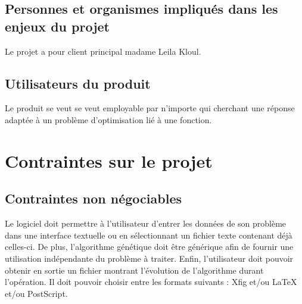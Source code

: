 \documentclass[a4paper,11pt]{article}
\begin{document}
		\subsection{Personnes et organismes impliqués dans les enjeux du projet}
			Le projet a pour client principal madame Leila Kloul.
			
		\subsection{ Utilisateurs du produit}
			Le produit se veut se veut employable par n’importe qui cherchant une réponse adaptée à un problème d’optimisation lié à une fonction.
			
	\section{Contraintes sur le projet}
		\subsection{Contraintes non négociables}
			Le logiciel doit permettre à l’utilisateur d’entrer les données de son problème dans une interface textuelle ou en sélectionnant un fichier texte contenant déjà celles-ci.
			De plus, l’algorithme génétique doit être générique afin de fournir une utilisation indépendante du problème à traiter. 
			Enfin, l’utilisateur doit pouvoir obtenir en sortie un fichier montrant l’évolution de l’algorithme durant l’opération.
			Il doit pouvoir choisir entre les formats suivants : Xfig et/ou  LaTeX et/ou PostScript.
		
\end{document}
